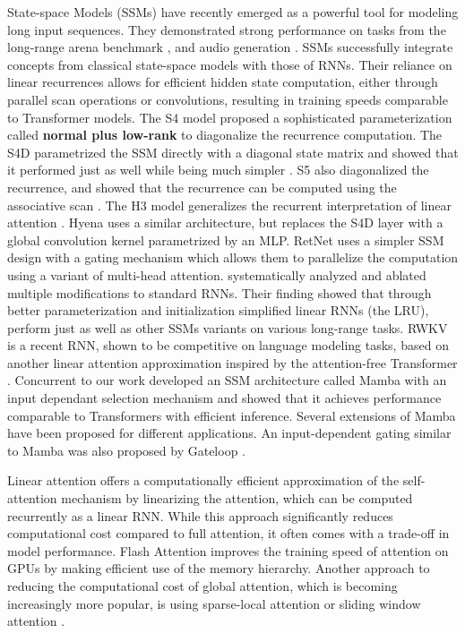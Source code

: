 State-space Models (SSMs) have recently emerged as a powerful tool for modeling long input sequences. They demonstrated strong performance on tasks from the long-range arena benchmark \citep{tay2020long}, and audio generation \citep{goel2022s}. SSMs successfully integrate concepts from classical state-space models \citep{kalman1960new} with those of RNNs. Their reliance on linear recurrences allows for efficient hidden state computation, either through parallel scan operations or convolutions, resulting in training speeds comparable to Transformer models. The S4 \citep{gu2021efficiently} model proposed a sophisticated parameterization called \textbf{normal plus low-rank} to diagonalize the recurrence computation. The S4D parametrized the SSM directly with a diagonal state matrix and showed that it performed just as well while being much simpler \citep{gu2022parameterization}. S5 also diagonalized the recurrence, and showed that the recurrence can be computed using the associative scan \citep{smith2022simplified}. The H3 model \citep{dao2022hungry} generalizes the recurrent interpretation of linear attention \citep{katharopoulos2020Transformers}. Hyena \citep{poli2023hyena} uses a similar architecture, but replaces the S4D layer with a global convolution kernel parametrized by an MLP. RetNet \citep{sun2023retentive} uses a simpler SSM design with a gating mechanism which allows them to parallelize the computation using a variant of multi-head attention. \cite{orvieto2023resurrecting}  systematically analyzed and ablated multiple modifications to standard RNNs. Their finding showed that through better parameterization and initialization simplified linear RNNs (the LRU), perform just as well as other SSMs variants on various long-range tasks. RWKV \citep{peng2023rwkv} is a recent RNN, shown to be competitive on language modeling tasks, based on another linear attention approximation inspired by the attention-free Transformer \citep{attention-free-Transformer}. Concurrent to our work \cite{gu2023mamba} developed an SSM architecture called Mamba with an input dependant selection mechanism and showed that it achieves performance comparable to Transformers with efficient inference. Several extensions of Mamba have been proposed \citep{wang2024mambabyte,zhu2024vision} for different applications. An input-dependent gating similar to Mamba was also proposed by Gateloop \citep{katsch2023gateloop}.

Linear attention \citep{katharopoulos2020Transformers} offers a computationally efficient approximation of the self-attention mechanism by linearizing the attention, which can be computed recurrently as a linear RNN. While this approach significantly reduces computational cost compared to full attention, it often comes with a trade-off in model performance. Flash Attention \citep{dao2022flashattention} improves the training speed of attention on GPUs by making efficient use of the memory hierarchy. Another approach to reducing the computational cost of global attention, which is becoming increasingly more popular, is using sparse-local attention \citep{child2019generating} or sliding window attention \citep{jiang2023mistral}.

